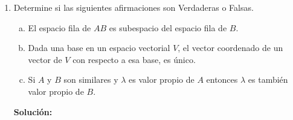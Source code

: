 \documentclass[12pt]{article}
\newenvironment{solucion}
{\begin{mdframed}[backgroundcolor=black!10]
		{\bf Solución:}\\
	}
	{
	\end{mdframed}
}
\newenvironment{preguntas}
{\begin{enumerate}\itemsep12pt
	}
	{
	\end{enumerate}
}
\begin{document}
\begin{preguntas}
\begin{solucion}
\begin{enumerate}[1)]
			\item $\lambda_3 = 3$\\
			\\
			Debemos resolver el sistema $(A-2I)v = 0$, esto es
			\small$$\begin{bmatrix}
			-2 & 2 & -1\\
			1 & -3 & 1\\
			4 & -4 & 2
			\end{bmatrix} \sim 
			\begin{bmatrix}
			1 & 0 & \frac{1}{4}\\
			0 & 1 & -\frac{1}{4}\\
			0 & 0 & 0
			\end{bmatrix}$$
			Por lo que
			$$\begin{array}{rcl}
			x_1 & = & -\dfrac{1}{4}x_3\\
			x_2 & = & \dfrac{1}{4}x_3\\
			x_3 & = & x_3
			\end{array} \Longrightarrow
			v_3 = \begin{pmatrix}
			-\frac{1}{4}\\
			\frac{1}{4}\\
			1
			\end{pmatrix} \rightarrow
			v_3 = \begin{pmatrix}
			-1\\
			1\\
			4
			\end{pmatrix}$$
		\end{enumerate}
		Finalmente, los vectores propios son
		$$v_1 = \begin{pmatrix}
		-1\\
		1\\
		2
		\end{pmatrix}, \quad
		v_2 = \begin{pmatrix}
		-2\\
		1\\
		4
		\end{pmatrix}, \quad
		v_3 = \begin{pmatrix}
		-1\\
		1\\
		4
		\end{pmatrix}$$
\end{solucion}
\item Determine si las siguientes afirmaciones son Verdaderas o Falsas.
\begin{enumerate}[a)]
\item El espacio fila de $AB$ es subespacio del espacio fila de $B$.
\item Dada una base en un espacio vectorial $V$, el vector coordenado de un vector de $V$ con respecto a esa base, es único.
\item Si $A$ y $B$ son similares y $\lambda$ es valor propio de $A$ entonces $\lambda$ es también valor propio de $B$.
\end{enumerate}
\begin{solucion}


\end{solucion}
\end{preguntas}
\end{document}
